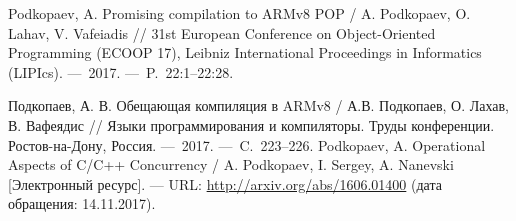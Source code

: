 \renewcommand{\refname}{Статьи в изданиях, входящих в базы цитирования Web of Science и SCOPUS}
\begin{thebibliography}{99}
\setcounter{enumiv}{\value{firstbib}}
 Podkopaev, A. Promising compilation to ARMv8 POP / A. Podkopaev, O. Lahav, V. Vafeiadis // 31st European Conference on Object-Oriented Programming (ECOOP 17), Leibniz International Proceedings in Informatics (LIPIcs).  ---~2017. ---~P.~22:1--22:28.
\setcounter{firstbib}{\value{enumiv}}
\end{thebibliography}

\renewcommand{\refname}{Статьи в других изданиях}
\begin{thebibliography}{99}
\setcounter{enumiv}{\value{firstbib}}
 Подкопаев, А. В. Обещающая компиляция в ARMv8 / А.В. Подкопаев, О. Лахав, В. Вафеядис // Языки программирования и компиляторы. Труды конференции. Ростов-на-Дону, Россия. ---~2017. ---~C.~223--226.
 Podkopaev, A. Operational Aspects of {C/C++} Concurrency / A. Podkopaev, I. Sergey, A. Nanevski
  [Электронный ресурс]. --- URL: \url{http://arxiv.org/abs/1606.01400} (дата обращения: 14.11.2017).
\end{thebibliography}
